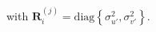\documentclass[letterpaper, 10 pt, conference]{ieeeconf}  %
\def\Vec#1{\mathbf{#1}}
\newcommand{\bbm}{\begin{bmatrix}}
\newcommand{\ebm}{\end{bmatrix}}
\begin{document}
with $\Vec{R}_i^{(j)} = \text{diag}\left\{\sigma^2_{u'}, \sigma^2_{v'}\right\}$.
\end{document}
